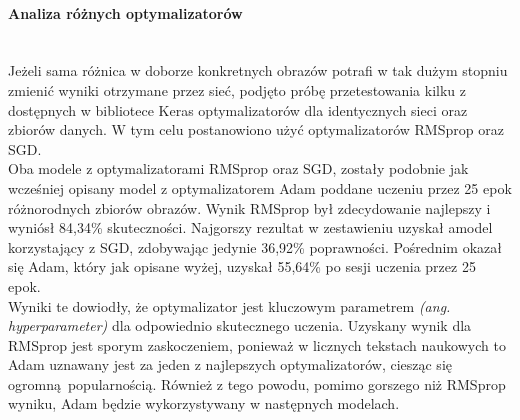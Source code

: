 \paragraph{Analiza różnych optymalizatorów} \mbox{}\\
Jeżeli sama różnica w doborze konkretnych obrazów potrafi w tak dużym stopniu zmienić wyniki
otrzymane przez sieć, podjęto próbę przetestowania kilku z dostępnych w bibliotece Keras
optymalizatorów dla identycznych sieci oraz zbiorów danych. W tym celu postanowiono użyć
optymalizatorów RMSprop oraz SGD.\\
Oba modele z optymalizatorami RMSprop oraz SGD, zostały podobnie jak wcześniej opisany model
z optymalizatorem Adam poddane uczeniu przez 25 epok różnorodnych zbiorów obrazów. Wynik RMSprop
był zdecydowanie najlepszy i wyniósł 84,34\% skuteczności. Najgorszy rezultat w zestawieniu
uzyskał amodel korzystający z SGD, zdobywając jedynie 36,92\% poprawności. Pośrednim okazał
się Adam, który jak opisane wyżej, uzyskał 55,64\% po sesji uczenia przez 25 epok.\\
Wyniki te dowiodły, że optymalizator jest kluczowym parametrem \textit{(ang. hyperparameter)}
dla odpowiednio skutecznego uczenia. Uzyskany wynik dla RMSprop jest sporym zaskoczeniem,
ponieważ w licznych tekstach naukowych to Adam uznawany jest za jeden z najlepszych
optymalizatorów, ciesząc się ogromną popularnością. Również z tego powodu, pomimo
gorszego niż RMSprop wyniku, Adam będzie wykorzystywany w następnych modelach.


